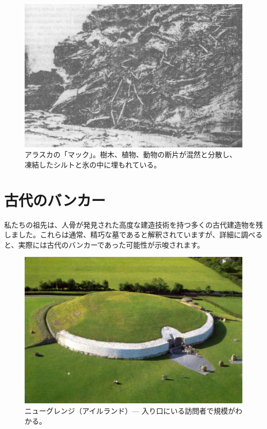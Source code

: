 \documentclass[10pt,twocolumn,letterpaper]{article}
\begin{document}
\begin{figure}[t]
\begin{center}
   \includegraphics[width=1\linewidth]{muck-crop.jpeg}
\end{center}
   \caption{アラスカの「マック」。樹木、植物、動物の断片が混然と分散し、凍結したシルトと氷の中に埋もれている\cite{146}。}
\label{fig:7}
\label{fig:onecol}
\end{figure}

\section{古代のバンカー}

私たちの祖先は、人骨が発見された高度な建造技術を持つ多くの古代建造物を残しました。これらは通常、精巧な墓であると解釈されていますが、詳細に調べると、実際には古代のバンカーであった可能性が示唆されます。

\begin{figure}[b]
\begin{center}
   \includegraphics[width=1\linewidth]{ww19.jpg}
\end{center}
   \caption{ニューグレンジ（アイルランド）— 入り口にいる訪問者で規模がわかる。}
\label{fig:8}
\label{fig:onecol}
\end{figure}
\end{document}
